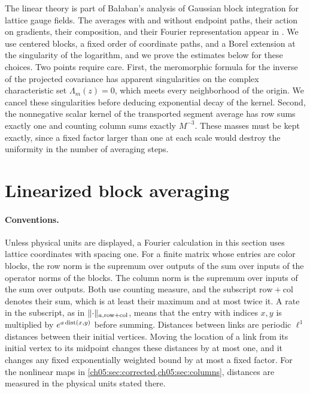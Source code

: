 The linear theory is part of Bałaban's analysis of Gaussian block integration for lattice gauge fields. The averages with and without endpoint paths, their action on gradients, their composition, and their Fourier representation appear in \cite[(1.8)--(1.13), p.~19, Section~B, and (1.29)--(1.32), p.~23]{Balaban1984I}. We use centered blocks, a fixed order of coordinate paths, and a Borel extension at the singularity of the logarithm, and we prove the estimates below for these choices. Two points require care. First, the meromorphic formula for the inverse of the projected covariance has apparent singularities on the complex characteristic set $\Lambda_m(z)=0$, which meets every neighborhood of the origin. We cancel these singularities before deducing exponential decay of the kernel. Second, the nonnegative scalar kernel of the transported segment average has row sums exactly one and counting column sums exactly $M^{-3}$. These masses must be kept exactly, since a fixed factor larger than one at each scale would destroy the uniformity in the number of averaging steps.

\section{Linearized block averaging}\label{ch05:sec:linear}

\paragraph{Conventions.}
Unless physical units are displayed, a Fourier calculation in this section uses lattice coordinates with spacing one. For a finite matrix whose entries are color blocks, the row norm is the supremum over outputs of the sum over inputs of the operator norms of the blocks. The column norm is the supremum over inputs of the sum over outputs. Both use counting measure, and the subscript $\mathrm{row}+\mathrm{col}$ denotes their sum, which is at least their maximum and at most twice it. A rate in the subscript, as in $\lVert \cdot\rVert_{a,\mathrm{row}+\mathrm{col}}$, means that the entry with indices $x,y$ is multiplied by $e^{a\operatorname{dist}(x,y)}$ before summing. Distances between links are periodic $\ell^1$ distances between their initial vertices. Moving the location of a link from its initial vertex to its midpoint changes these distances by at most one, and it changes any fixed exponentially weighted bound by at most a fixed factor. For the nonlinear maps in \cref{ch05:sec:corrected,ch05:sec:columns}, distances are measured in the physical units stated there.

